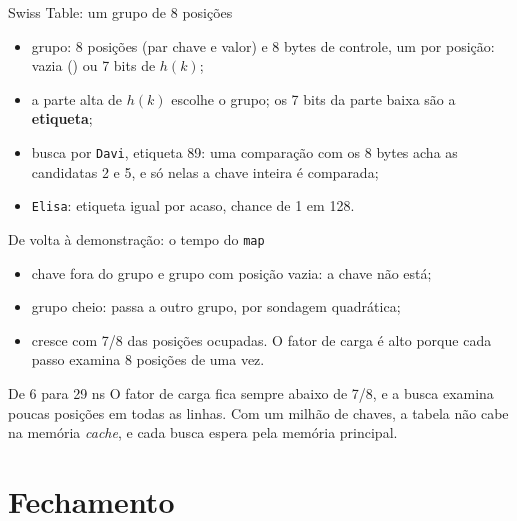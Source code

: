 \documentclass{beamer}
\begin{document}
\begin{frame}{Swiss Table: um grupo de 8 posições}
	\begin{center}
		\resizebox{\textwidth}{!}{\swissGrupo}
	\end{center}

	\small
	\begin{itemize}
		\item grupo: 8 posições (par chave e valor) e 8 bytes de controle, um por
		      posição: vazia (\texttt{\vz}) ou 7 bits de $h(k)$;
		\item a parte alta de $h(k)$ escolhe o grupo; os 7 bits da parte baixa são
		      a \textbf{etiqueta};
		\item busca por \texttt{Davi}, etiqueta 89: uma comparação com os 8 bytes
		      acha as candidatas 2 e 5, e só nelas a chave inteira é comparada;
		\item \texttt{Elisa}: etiqueta igual por acaso, chance de 1 em 128.
	\end{itemize}
\end{frame}

\begin{frame}{De volta à demonstração: o tempo do \texttt{map}}
	\begin{itemize}
		\item chave fora do grupo e grupo com posição vazia: a chave não está;
		\item grupo cheio: passa a outro grupo, por sondagem quadrática;
		\item cresce com 7/8 das posições ocupadas. O fator de carga é alto porque
		      cada passo examina 8 posições de uma vez.
	\end{itemize}

	\vspace{0.4cm}
	\begin{block}{De 6 para 29 ns}
		O fator de carga fica sempre abaixo de 7/8, e a busca examina poucas
		posições em todas as linhas. Com um milhão de chaves, a tabela não cabe na
		memória \emph{cache}, e cada busca espera pela memória principal.
	\end{block}
\end{frame}

\section{Fechamento}
\end{document}
